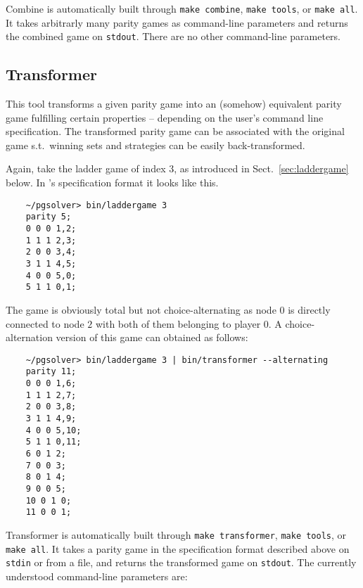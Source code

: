 Combine is automatically built through \verb#make combine#,
\verb#make tools#, or \verb#make all#.
It takes arbitrarly many parity games as command-line parameters and returns the
combined game on \texttt{stdout}. There are no other command-line parameters.


\subsection{Transformer}

This tool transforms a given parity game into an (somehow) equivalent parity game fulfilling
certain properties -- depending on the user's command line specification. The transformed
parity game can be associated with the original game s.t.\ winning sets and strategies can
be easily back-transformed.


\begin{example}
Again, take the ladder game of index 3, as introduced in Sect.~\ref{sec:laddergame} below.
In \pgsolver's specification format it looks like this.
\begin{verbatim}
    ~/pgsolver> bin/laddergame 3
    parity 5;
    0 0 0 1,2;
    1 1 1 2,3;
    2 0 0 3,4;
    3 1 1 4,5;
    4 0 0 5,0;
    5 1 1 0,1;
\end{verbatim}
The game is obviously total but not choice-alternating as node $0$ is directly connected to node $2$
with both of them belonging to player $0$. A choice-alternation version of this game can obtained as follows:
\begin{verbatim}
    ~/pgsolver> bin/laddergame 3 | bin/transformer --alternating
    parity 11;
    0 0 0 1,6;
    1 1 1 2,7;
    2 0 0 3,8;
    3 1 1 4,9;
    4 0 0 5,10;
    5 1 1 0,11;
    6 0 1 2;
    7 0 0 3;
    8 0 1 4;
    9 0 0 5;
    10 0 1 0;
    11 0 0 1;
\end{verbatim}
\end{example}

Transformer is automatically built through \verb#make transformer#,
\verb#make tools#, or \verb#make all#.
It takes a parity game in the specification format described above on \texttt{stdin} or from a file,
and returns the transformed game on \texttt{stdout}. The currently understood command-line parameters are:

